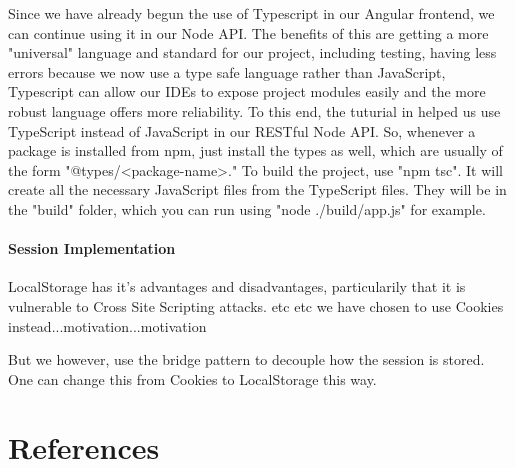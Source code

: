 \documentclass[11pt]{article}
\begin{document}
Since we have already begun the use of Typescript in our Angular frontend, we can continue using it in our Node API. The benefits of this are getting a more "universal" language and standard for our project, including testing, having less errors because we now use a type safe language rather than JavaScript, Typescript can allow our IDEs to expose project modules easily and the more robust language offers more reliability\cite{Website:9}. To this end, the tuturial in \cite{Website:9} helped us use TypeScript instead of JavaScript in our RESTful Node API. So, whenever a package is installed from npm, just install the types as well, which are usually of the form "@types/<package-name>." To build the project, use "npm tsc". It will create all the necessary JavaScript files from the TypeScript files. They will be in the "build" folder, which you can run using "node ./build/app.js" for example.

\paragraph{Session Implementation}
LocalStorage has it's advantages and disadvantages, particularily that it is vulnerable to Cross Site Scripting attacks. etc etc we have chosen to use Cookies instead...motivation...motivation\par

But we however, use the bridge pattern to decouple how the session is stored. One can change this from Cookies to LocalStorage this way.

\section{References}


\end{document}
